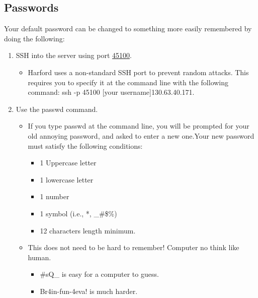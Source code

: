 \documentclass[final,titlepage,letterpaper,oneside,12pt]{article}
\renewcommand{\texttt}[2][BrickRed]{\textcolor{#1}{\ttfamily #2}}%
\begin{document}
\subsection{Passwords}

Your default password can be changed to something more easily remembered by doing the following:

\begin{enumerate} \itemsep-2pt

    \item{SSH into the server using port \href{http://en.wikipedia.org/wiki/Looking_Glass_Studios}{45100}.}

    \begin{itemize} \itemsep-2pt
        
        \item{Harford uses a non-standard SSH port to prevent random attacks. This requires you to specify it at the command line with the following command: \texttt{ssh -p 45100 [your username]\@130.63.40.171}.}

    \end{itemize}
    
    \item{Use the \texttt{passwd} command.}
    
    \begin{itemize} \itemsep-2pt
        
        \item{If you type passwd at the command line, you will be prompted for your old annoying password, and asked to enter a new one.Your new password must satisfy the following conditions:}
        
        \begin{itemize} \itemsep-2pt
            \item{1 Uppercase letter}
            \item{1 lowercase letter}
            \item{1 number}
            \item{1 symbol (i.e., *, \_\#\$\%)}
            \item{12 characters length minimum.}
        \end{itemize}
        
        \item{This does not need to be hard to remember! Computer no think like human.}
        
        \begin{itemize} \itemsep-2pt
            
            \item{\texttt{\#sQ\_} is easy for a computer to guess.}

            \item{\texttt{Br4in-fun-4eva!} is much harder.}

        \end{itemize}
    \end{itemize}
\end{enumerate}
\end{document}
